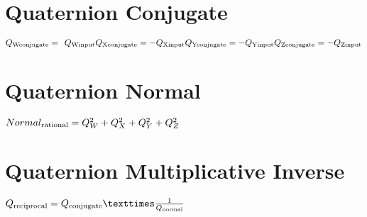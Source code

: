 \documentclass{article}
\begin{document}
\section{Quaternion Conjugate}
\begin{linenomath}
\begin{center}
$
Q_\textrm{Wconjugate} =  \hspace{1ex}Q_\textrm{Winput}\newline
Q_\textrm{Xconjugate} =  -Q_\textrm{Xinput}\newline
Q_\textrm{Yconjugate} = -Q_\textrm{Yinput}\newline
Q_\textrm{Zconjugate} =  -Q_\textrm{Zinput}\newline
$
\end{center}
\end{linenomath}


\section{Quaternion Normal}
\begin{linenomath}
\begin{center}
$
Normal_\textrm{rational} = Q_W^2 + Q_X^2 + Q_Y^2 + Q_Z^2 \newline
$
\end{center}
\end{linenomath}


\section{Quaternion Multiplicative Inverse}
\begin{linenomath}
\begin{center}
$
Q_\textrm{reciprocal} = Q_\textrm{conjugate} × \frac{1}{Q_\textrm{normal}} \newline
\newline
\newline
\newline
\newline
\newline
\newline
\newline
\newline
$
\end{center}
\end{linenomath}
\end{document}
